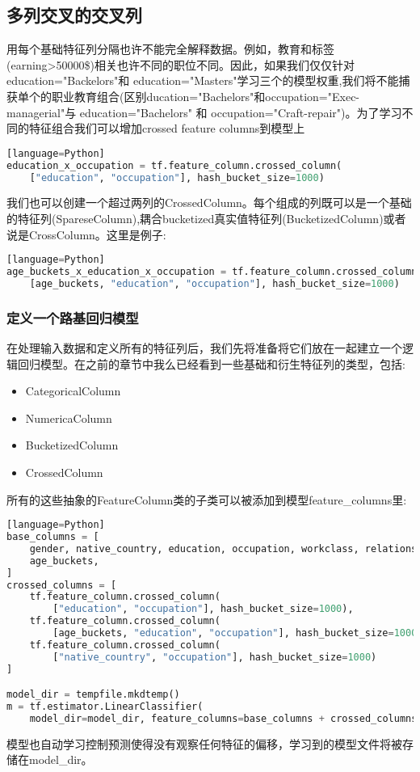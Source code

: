 \subsection{多列交叉的交叉列}
用每个基础特征列分隔也许不能完全解释数据。例如，教育和标签(earning>50000\$)相关也许不同的职位不同。因此，如果我们仅仅针对education="Backelors"和 education="Masters"学习三个的模型权重,我们将不能捕获单个的职业教育组合(区别ducation="Bachelors"和occupation="Exec-managerial"与 education="Bachelors" 和 occupation="Craft-repair")。为了学习不同的特征组合我们可以增加crossed feature columns到模型上
\begin{lstlisting}[language=Python][language=Python]
education_x_occupation = tf.feature_column.crossed_column(
    ["education", "occupation"], hash_bucket_size=1000)
\end{lstlisting}
我们也可以创建一个超过两列的CrossedColumn。每个组成的列既可以是一个基础的特征列(SpareseColumn),耦合bucketized真实值特征列(BucketizedColumn)或者说是CrossColumn。这里是例子:
\begin{lstlisting}[language=Python][language=Python]
age_buckets_x_education_x_occupation = tf.feature_column.crossed_column(
    [age_buckets, "education", "occupation"], hash_bucket_size=1000)
\end{lstlisting}
\subsubsection{定义一个路基回归模型}
在处理输入数据和定义所有的特征列后，我们先将准备将它们放在一起建立一个逻辑回归模型。在之前的章节中我么已经看到一些基础和衍生特征列的类型，包括:
\begin{itemize}
  \item CategoricalColumn
  \item NumericaColumn
  \item BucketizedColumn
  \item CrossedColumn
\end{itemize}
所有的这些抽象的FeatureColumn类的子类可以被添加到模型feature\_columns里:
\begin{lstlisting}[language=Python][language=Python]
base_columns = [
    gender, native_country, education, occupation, workclass, relationship,
    age_buckets,
]
crossed_columns = [
    tf.feature_column.crossed_column(
        ["education", "occupation"], hash_bucket_size=1000),
    tf.feature_column.crossed_column(
        [age_buckets, "education", "occupation"], hash_bucket_size=1000),
    tf.feature_column.crossed_column(
        ["native_country", "occupation"], hash_bucket_size=1000)
]

model_dir = tempfile.mkdtemp()
m = tf.estimator.LinearClassifier(
    model_dir=model_dir, feature_columns=base_columns + crossed_columns)
\end{lstlisting}
模型也自动学习控制预测使得没有观察任何特征的偏移，学习到的模型文件将被存储在model\_dir。
